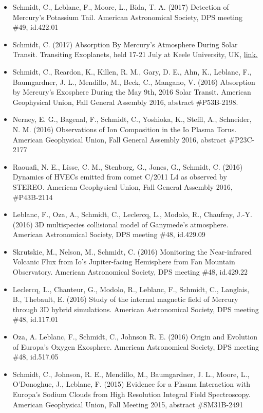 \documentclass[12pt]{report}
\begin{document}
\begin{itemize}
   \item Schmidt, C., Leblanc, F., Moore, L., Bida, T. A. (2017) Detection of Mercury's Potassium Tail. American Astronomical Society, DPS meeting \#49, id.422.01
   \item Schmidt, C. (2017) Absorption By Mercury's Atmosphere During Solar Transit. Transiting Exoplanets, held 17-21 July at Keele University, UK, \href{https://wasp-planets.net/conference/talk-abstracts/#44}{link.} 
   \item Schmidt, C., Reardon, K., Killen, R. M., Gary, D. E., Ahn, K., Leblanc, F., Baumgardner, J. L., Mendillo, M., Beck, C., Mangano, V. (2016) Absorption by Mercury's Exosphere During the May 9th, 2016 Solar Transit. American Geophysical Union, Fall General Assembly 2016, abstract \#P53B-2198.
   \item Nerney, E. G., Bagenal, F., Schmidt, C., Yoshioka, K., Steffl, A., Schneider, N. M. (2016) Observations of Ion Composition in the Io Plasma Torus. American Geophysical Union, Fall General Assembly 2016, abstract \#P23C-2177
   \item Raouafi, N. E., Lisse, C. M., Stenborg, G., Jones, G., Schmidt, C. (2016) Dynamics of HVECs emitted from comet C/2011 L4 as observed by STEREO. American Geophysical Union, Fall General Assembly 2016, \#P43B-2114
   \item Leblanc, F., Oza, A., Schmidt, C., Leclercq, L., Modolo, R., Chaufray, J.-Y. (2016) 3D multispecies collisional model of Ganymede's atmosphere. American Astronomical Society, DPS meeting \#48, id.429.09
   \item Skrutskie, M., Nelson, M., Schmidt, C. (2016) Monitoring the Near-infrared Volcanic Flux from Io's Jupiter-facing Hemisphere from Fan Mountain Observatory. American Astronomical Society, DPS meeting \#48, id.429.22
   \item Leclercq, L., Chanteur, G., Modolo, R., Leblanc, F., Schmidt, C., Langlais, B., Thebault, E. (2016) Study of the internal magnetic field of Mercury through 3D hybrid simulations. American Astronomical Society, DPS meeting \#48, id.117.01
   \item Oza, A. Leblanc, F., Schmidt, C., Johnson R. E. (2016) Origin and Evolution of Europa's Oxygen Exosphere. American Astronomical Society, DPS meeting \#48, id.517.05
   \item Schmidt, C., Johnson, R. E., Mendillo, M., Baumgardner, J. L., Moore, L., O'Donoghue, J., Leblanc, F. (2015) Evidence for a Plasma Interaction with Europa's Sodium Clouds from High Resolution Integral Field Spectroscopy. American Geophysical Union, Fall Meeting 2015, abstract \#SM31B-2491

\end{itemize}
\end{document}
